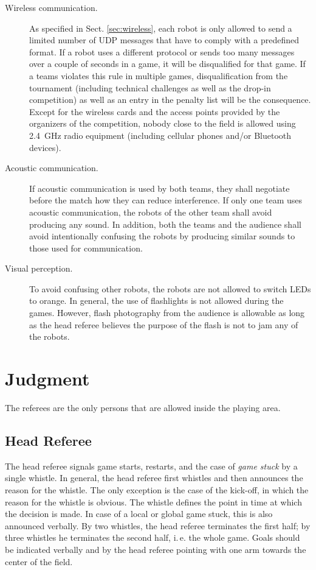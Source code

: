 \documentclass[12pt]{article}
\newcommand{\ie}{\mbox{i.\,e.}\xspace}
\begin{document}
\begin{description}

\item[Wireless communication.] As specified in Sect. \ref{sec:wireless}, each robot is only allowed to send a limited number of UDP messages that have to comply with a predefined format. If a robot uses a different protocol or sends too many messages over a couple of seconds in a game, it will be disqualified for that game. If a teams violates this rule in multiple games, disqualification from the tournament (including technical challenges as well as the drop-in competition) as well as an entry in the penalty list will be the consequence. Except for the wireless cards and the access points provided by the organizers of the competition, nobody close to the field is allowed using 2.4~GHz radio equipment (including cellular phones and/or Bluetooth devices).

\item[Acoustic communication.] If acoustic communication is used by both teams, they shall negotiate before the match how they can reduce interference. If only one team uses acoustic communication, the robots of the other team shall avoid producing any sound. In addition, both the teams and the audience shall avoid intentionally confusing the robots by producing similar sounds to those used for communication.

\item[Visual perception.] To avoid confusing other robots, the robots are not allowed to switch LEDs to orange. In general, the use of flashlights is not allowed during the games.  However, flash photography from the audience is allowable as long as the head referee believes the purpose of the flash is not to jam any of the robots.

\end{description}


\newpage


\section{Judgment}

The referees are the only persons that are allowed inside the playing area.

\subsection{Head Referee}
\label{sec:head_referee}
The head referee signals game starts, restarts, and the case of \emph{game stuck} by a single whistle. In general, the head referee first whistles and then announces the reason for the whistle. The only exception is the case of the kick-off, in which the reason for the whistle is obvious. The whistle defines the point in time at which the decision is made. In case of a local or global game stuck, this is also announced verbally. By two whistles, the head referee terminates the first half; by three whistles he terminates the second half, \ie the whole game.  Goals should be indicated verbally and by the head referee pointing with one arm towards the center of the field.
\end{document}
